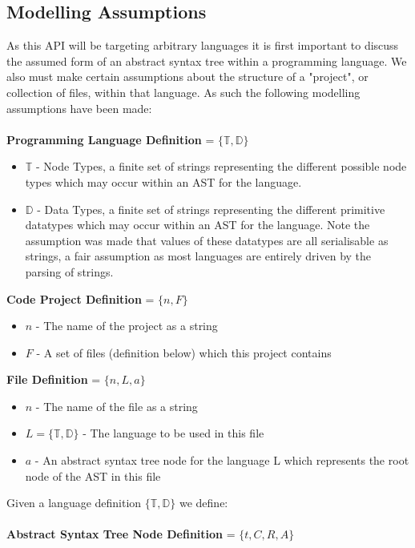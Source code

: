 \documentclass{report}
\begin{document}
\subsection{Modelling Assumptions}
As this API will be targeting arbitrary languages it is first important to discuss the assumed form of an abstract syntax tree within a programming language. We also must make certain assumptions about the structure of a "project", or collection of files, within that language. As such the following modelling assumptions have been made:
\\
\\
\textbf{Programming Language Definition} = $\{\mathbb{T},\mathbb{D}\}$ 
\begin{itemize}
\item $\mathbb{T}$ - Node Types, a finite set of strings representing the different possible node types which may occur within an AST for the language.
\item $\mathbb{D}$ - Data Types, a finite set of strings representing the different primitive datatypes which may occur within an AST for the language. Note the assumption was made that values of these datatypes are all serialisable as strings, a fair assumption as most languages are entirely driven by the parsing of strings.
\end{itemize}
%
\textbf{Code Project Definition} = $\{n,F \}$ 
\begin{itemize}
\item $n$ - The name of the project as a string
\item $F$ - A set of files (definition below) which this project contains
\end{itemize}
%
\textbf{File Definition} = $\{n, L, a\}$ 
\begin{itemize}
\item $n$ - The name of the file as a string
\item $L=\{\mathbb{T},\mathbb{D}\}$ - The language to be used in this file
\item $a$ - An abstract syntax tree node for the language L which represents the root node of the AST in this file
\end{itemize}
%
Given a language definition $\{\mathbb{T},\mathbb{D}\}$ we define:\\
\\
\textbf{Abstract Syntax Tree Node Definition} = $\{t,C,R,A\}$ 
\end{document}
